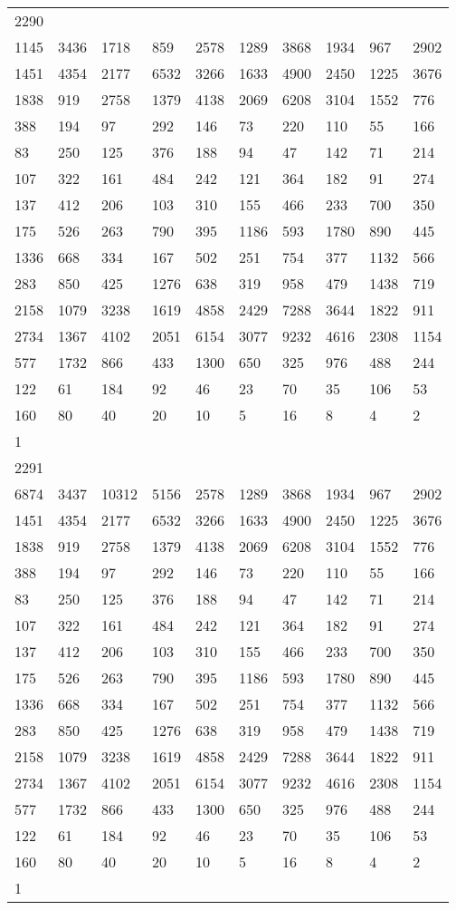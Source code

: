 \begin{longtable}{*{10}{l}}
2290&&&&&&&&&\\
1145& 3436& 1718& 859& 2578& 1289& 3868& 1934& 967& 2902\\
1451& 4354& 2177& 6532& 3266& 1633& 4900& 2450& 1225& 3676\\
1838& 919& 2758& 1379& 4138& 2069& 6208& 3104& 1552& 776\\
388& 194& 97& 292& 146& 73& 220& 110& 55& 166\\
83& 250& 125& 376& 188& 94& 47& 142& 71& 214\\
107& 322& 161& 484& 242& 121& 364& 182& 91& 274\\
137& 412& 206& 103& 310& 155& 466& 233& 700& 350\\
175& 526& 263& 790& 395& 1186& 593& 1780& 890& 445\\
1336& 668& 334& 167& 502& 251& 754& 377& 1132& 566\\
283& 850& 425& 1276& 638& 319& 958& 479& 1438& 719\\
2158& 1079& 3238& 1619& 4858& 2429& 7288& 3644& 1822& 911\\
2734& 1367& 4102& 2051& 6154& 3077& 9232& 4616& 2308& 1154\\
577& 1732& 866& 433& 1300& 650& 325& 976& 488& 244\\
122& 61& 184& 92& 46& 23& 70& 35& 106& 53\\
160& 80& 40& 20& 10& 5& 16& 8& 4& 2\\
1& \\

2291&&&&&&&&&\\
6874& 3437& 10312& 5156& 2578& 1289& 3868& 1934& 967& 2902\\
1451& 4354& 2177& 6532& 3266& 1633& 4900& 2450& 1225& 3676\\
1838& 919& 2758& 1379& 4138& 2069& 6208& 3104& 1552& 776\\
388& 194& 97& 292& 146& 73& 220& 110& 55& 166\\
83& 250& 125& 376& 188& 94& 47& 142& 71& 214\\
107& 322& 161& 484& 242& 121& 364& 182& 91& 274\\
137& 412& 206& 103& 310& 155& 466& 233& 700& 350\\
175& 526& 263& 790& 395& 1186& 593& 1780& 890& 445\\
1336& 668& 334& 167& 502& 251& 754& 377& 1132& 566\\
283& 850& 425& 1276& 638& 319& 958& 479& 1438& 719\\
2158& 1079& 3238& 1619& 4858& 2429& 7288& 3644& 1822& 911\\
2734& 1367& 4102& 2051& 6154& 3077& 9232& 4616& 2308& 1154\\
577& 1732& 866& 433& 1300& 650& 325& 976& 488& 244\\
122& 61& 184& 92& 46& 23& 70& 35& 106& 53\\
160& 80& 40& 20& 10& 5& 16& 8& 4& 2\\
1& \\


\end{longtable}
